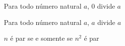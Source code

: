 \begin{exercise}
	Para todo número natural $a$, $0$ divide $a$
\end{exercise}

\begin{exercise}
	Para todo número natural $a$, $a$ divide $a$
\end{exercise}

\begin{exercise}
	$n$ é par se e somente se $n^2$ é par
\end{exercise}

